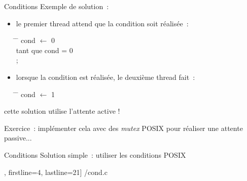 \begin {frame} {Conditions}
    Exemple de solution~:

    \begin {itemize}
	\item le premier thread attend que la condition soit réalisée~:

	    \begin {tabbing}
		\hspace* {10mm} \= \hspace* {5mm} \= \kill
		\> cond $\leftarrow$ 0 \\
		\> tant que cond = 0 \\
		\> \> ;
	    \end {tabbing}

	\item lorsque la condition est réalisée, le deuxième thread 
	    fait~:

	    \begin {tabbing}
		\hspace* {10mm} \= \hspace* {5mm} \= \kill
		\> cond $\leftarrow$ 1 \\
	    \end {tabbing}

    \end {itemize}

    \vspace* {3mm}

    \implique cette solution utilise l'attente active !

    \vspace* {3mm}

    Exercice~: implémenter cela avec des \emph {mutex} POSIX pour
    réaliser une attente passive...

\end {frame}

\begin {frame} [fragile] {Conditions}
    Solution simple~: utiliser les conditions POSIX

    \scriptsize\lstmonstyle, firstline=4, lastline=21] {\inc/cond.c}
\end{frame}

